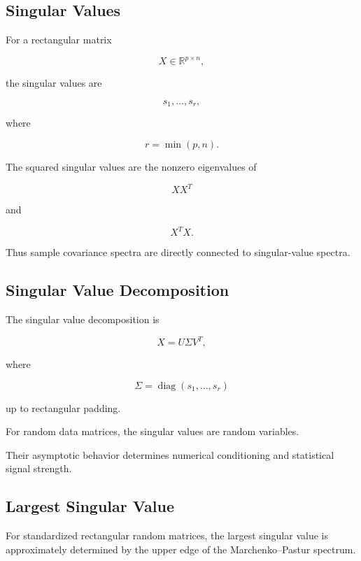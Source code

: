 \subsection{Singular Values}
\label{subsec:singular-values-random-matrices}

For a rectangular matrix

\[
X\in\mathbb{R}^{p\times n},
\]

the singular values are

\[
s_1,\ldots,s_r,
\]

where

\[
r=\min(p,n).
\]

The squared singular values are the nonzero eigenvalues of

\[
XX^T
\]

and

\[
X^TX.
\]

Thus sample covariance spectra are directly connected to singular-value
spectra.

\subsection{Singular Value Decomposition}
\label{subsec:random-svd}

The singular value decomposition is

\[
\boxed{
X
=
U\Sigma V^T,
}
\]

where

\[
\Sigma
=
\operatorname{diag}
(
s_1,\ldots,s_r
)
\]

up to rectangular padding.

For random data matrices, the singular values are random variables.

Their asymptotic behavior determines numerical conditioning and
statistical signal strength.

\subsection{Largest Singular Value}
\label{subsec:largest-singular-value}

For standardized rectangular random matrices, the largest singular value
is approximately determined by the upper edge of the
Marchenko--Pastur spectrum.

